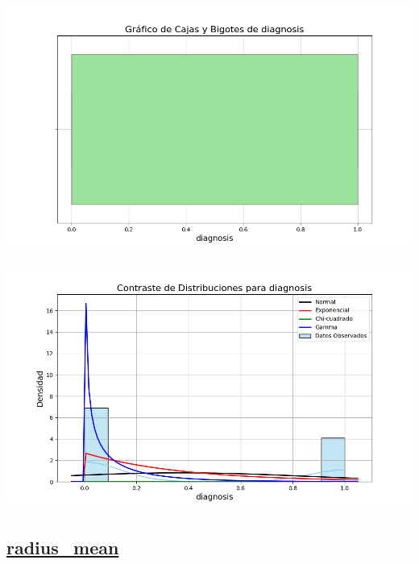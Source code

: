 \documentclass[a4paper, 12pt]{article}
\begin{document}
	\includegraphics[width=\textwidth]{../Plots/plots_stats/diagnosis/boxplot_diagnosis.png}

	\includegraphics[width=\textwidth]{../Plots/plots_stats/diagnosis/distribuciones_conocidas_diagnosis.png}


\subsection*{\underline{radius\_mean}}
\end{document}
